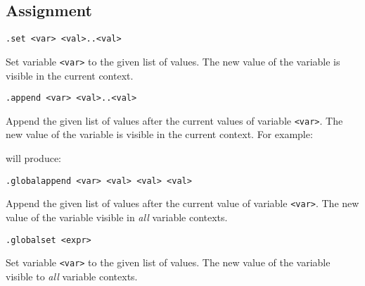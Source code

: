 \subsection{Assignment}
\begin{verbatim}
.set <var> <val>..<val>
\end{verbatim}
\begin{desc}
Set variable {\tt <var>} to the given list of values.
The new value of the variable is visible in the current context.
\end{desc}
\begin{verbatim}
.append <var> <val>..<val>
\end{verbatim}
\begin{desc}
Append the given list of values after the current values of variable
{\tt <var>}.
The new value of the variable is visible in the current context.
For example:

will produce:

\end{desc}
\begin{verbatim}
.globalappend <var> <val> <val> <val>
\end{verbatim}
\begin{desc}
Append the given list of values after the current value of variable
\verb'<var>'. The new value of the variable visible in {\em all}
variable contexts.
\end{desc}
\begin{verbatim}
.globalset <expr>
\end{verbatim}
\begin{desc}
Set variable \verb'<var>' to the given list of values.  The new value
of the variable visible to {\em all} variable contexts.
\end{desc}
